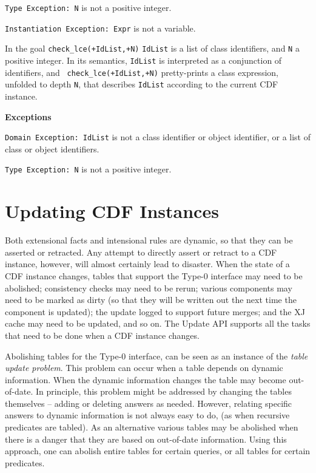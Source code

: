 \begin{description}
{\tt Type Exception: N} is not a positive integer.

{\tt Instantiation Exception: Expr} is not a variable.

In the goal {\tt check\_lce(+IdList,+N)} {\tt IdList} is a list of
class identifiers, and {\tt N} a positive integer.  In its semantics,
{\tt IdList} is interpreted as a conjunction of identifiers, and {\tt
check\_lce(+IdList,+N)} pretty-prints a class expression, unfolded to
depth {\tt N}, that describes {\tt IdList} according to the current
CDF instance.

{\bf Exceptions} 

{\tt Domain Exception: IdList} is not a class identifier or object
identifier, or a list of class or object identifiers.

{\tt Type Exception: N} is not a positive integer.

\end{description}

\section{Updating CDF Instances} \label{sec:update}

Both extensional facts and intensional rules are dynamic, so that they
can be asserted or retracted.  Any attempt to directly assert or
retract to a CDF instance, however, will almost certainly lead to
disaster.  When the state of a CDF instance changes, tables that
support the Type-0 interface may need to be abolished; consistency
checks may need to be rerun; various components may need to be marked
as dirty (so that they will be written out the next time the component
is updated); the update logged to support future merges; and the XJ
cache may need to be updated, and so on.  The Update API supports all
the tasks that need to be done when a CDF instance changes.

Abolishing tables for the Type-0 interface, can be seen as an instance
of the {\em table update problem}.  This problem can occur when a
table depends on dynamic information.  When the dynamic information
changes the table may become out-of-date.  In principle, this problem
might be addressed by changing the tables themselves -- adding or
deleting answers as needed.  However, relating specific answers to
dynamic information is not always easy to do, (as when recursive
predicates are tabled).  As an alternative various tables may be
abolished when there is a danger that they are based on out-of-date
information.  Using this approach, one can abolish entire tables for
certain queries, or all tables for certain predicates.

